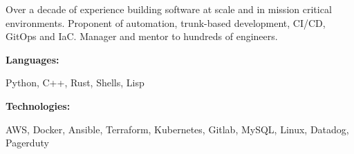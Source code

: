 \documentclass[9pt]{developercv} %
\begin{document}
\begin{minipage}[t]{0.45\textwidth} %

  \vspace{-6pt}

  Over a decade of experience building software at scale and in mission critical
  environments. Proponent of automation, trunk-based development, CI/CD, GitOps
  and IaC. Manager and mentor to hundreds of engineers.
\end{minipage}
\hfill %
\begin{minipage}[t]{0.50\textwidth} %

  \vspace{-6pt}

    \begin{minipage}[t]{0.3\textwidth}
	  \textbf{Languages:}
    \end{minipage}
    \hfill
    \begin{minipage}[t]{0.6\textwidth}
      Python, C++, Rust, Shells, Lisp
    \end{minipage}

	\vspace{2mm}

    \begin{minipage}[t]{0.3\textwidth}
	  \textbf{Technologies:}
    \end{minipage}
    \hfill
    \begin{minipage}[t]{0.6\textwidth}
	  AWS, Docker, Ansible, Terraform, Kubernetes, Gitlab, MySQL, Linux, Datadog, Pagerduty
    \end{minipage}
\end{minipage}


\end{document}
